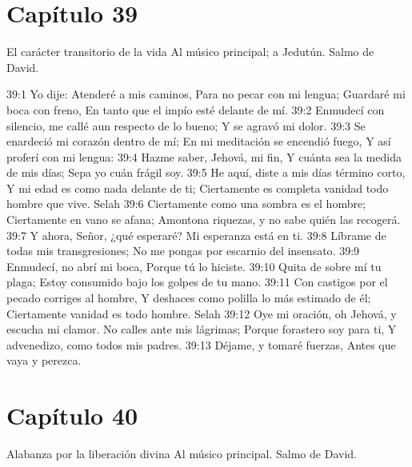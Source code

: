 \section*{Capítulo 39}
El carácter transitorio de la vida 
Al músico principal; a Jedutún. Salmo de David. 
 
39:1 Yo dije: Atenderé a mis caminos, 
Para no pecar con mi lengua; 
Guardaré mi boca con freno, 
En tanto que el impío esté delante de mí. 
39:2 Enmudecí con silencio, me callé aun respecto de lo bueno; 
Y se agravó mi dolor. 
39:3 Se enardeció mi corazón dentro de mí; 
En mi meditación se encendió fuego, 
Y así proferí con mi lengua: 
39:4 Hazme saber, Jehová, mi fin, 
Y cuánta sea la medida de mis días; 
Sepa yo cuán frágil soy. 
39:5 He aquí, diste a mis días término corto, 
Y mi edad es como nada delante de ti; 
Ciertamente es completa vanidad todo hombre que vive. Selah 
39:6 Ciertamente como una sombra es el hombre; 
Ciertamente en vano se afana; 
Amontona riquezas, y no sabe quién las recogerá. 
39:7 Y ahora, Señor, ¿qué esperaré? 
Mi esperanza está en ti. 
39:8 Líbrame de todas mis transgresiones; 
No me pongas por escarnio del insensato. 
39:9 Enmudecí, no abrí mi boca, 
Porque tú lo hiciste. 
39:10 Quita de sobre mí tu plaga; 
Estoy consumido bajo los golpes de tu mano. 
39:11 Con castigos por el pecado corriges al hombre, 
Y deshaces como polilla lo más estimado de él; 
Ciertamente vanidad es todo hombre. Selah 
39:12 Oye mi oración, oh Jehová, y escucha mi clamor. 
No calles ante mis lágrimas; 
Porque forastero soy para ti, 
Y advenedizo, como todos mis padres. 
39:13 Déjame, y tomaré fuerzas, 
Antes que vaya y perezca. 
\section*{Capítulo 40}
Alabanza por la liberación divina 
Al músico principal. Salmo de David. 
 
